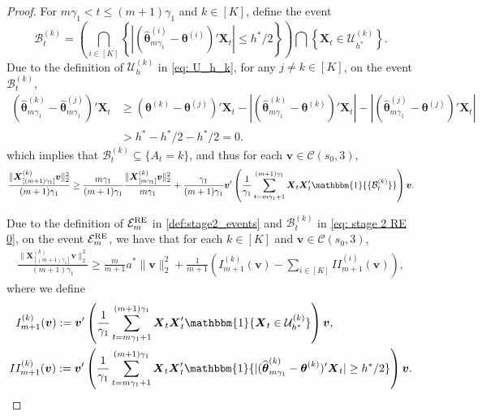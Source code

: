 \documentclass[aos,preprint]{imsart}
\theoremstyle{plain}
\theoremstyle{definition}
\newcommand{\btheta}{\boldsymbol{\theta}}
\newcommand{\hbtheta}{\widehat{\boldsymbol{\theta}}}
\newcommand{\idf}{\mathbbm{1}}
\newcommand{\bX}{\boldsymbol{X}}
\newcommand{\mC}{\mathcal{C}}
\newcommand{\bv}{\boldsymbol{v}}
\newcommand{\mE}{\mathcal{E}}
\begin{document}
\begin{appendix}
\begin{proof}
\medskip
For $m\gamma_1<t\le (m+1)\gamma_1$ and $k \in [K]$, define the event 
\begin{equation}\label{eq: stage 2 RE 0}
    \mathcal{B}_t^{(k)}= \left(\bigcap_{i\in [K]}\left\{ |(\hbtheta_{m\gamma_1}^{(i)}-\btheta^{(i)})'\bX_t|\le {h^*}/{2} \right\} \right) \bigcap \left\{\bX_t\in \mathcal{U}_{h^*}^{(k)} \right\}.
\end{equation}
Due to the definition of $\mathcal{U}_h^{(k)}$ in \eqref{eq: U_h_k}, for any $j \neq k \in [K]$,    on the event $\mathcal{B}_t^{(k)}$, 
\begin{align*}
     (\hbtheta_{m\gamma_1}^{(k)}-\hbtheta_{m\gamma_1}^{(j)})'\bX_t &\ge (\btheta^{(k)}- \btheta^{(j)})'\bX_t - |(\hbtheta_{m\gamma_1}^{(k)}-\btheta^{(k)})'\bX_t| - |(\hbtheta_{m\gamma_1}^{(j)}-\btheta^{(j)})'\bX_t|
     \\&> h^*-h^*/2-h^*/2=0.
\end{align*}
 which implies that $\mathcal{B}_t^{(k)}\subseteq \{A_t=k\}$, and thus for each $\bv\in \mC(s_0,3)$,
 \begin{align*}
     \frac{\|\bX_{[(m+1)\gamma_1]}^{(k)} \bv\|_2^2}{(m+1)\gamma_1} \geq \frac{m\gamma_1}{(m+1)\gamma_1}\frac{\|\bX_{[m\gamma_1]}^{(k)} \bv\|_2^2}{m\gamma_1} + \frac{\gamma_1}{(m+1)\gamma_1} \bv'\left(\frac{1}{\gamma_1}\sum_{t=m\gamma_1+1}^{(m+1)\gamma_1} \bX_t\bX_t'\idf{\{\mathcal{B}_t^{(k)}\}} \right) \bv.
 \end{align*}

Due to the definition of $\mE_{m}^{\textup{RE}}$ in \eqref{def:stage2_events} and $\mathcal{B}_t^{(k)}$ in \eqref{eq: stage 2 RE 0}, on the event $\mE_{m}^{\textup{RE}}$, we have that for each $k \in [K]$ and $\bv\in \mC(s_0,3)$,
\begin{equation}\label{eq: stage 2 RE 1}
\begin{aligned}
   \frac{\|\bX_{[(m+1)\gamma_1]}^{(k)} \bv\|_2^2}{(m+1)\gamma_1} \geq \frac{m}{m+1} a^*\|\bv\|_2^2 + \frac{1}{m+1} \left(I_{m+1}^{(k)}(\bv) - \sum_{i \in [K]} II_{m+1}^{(i)}(\bv) \right), 
\end{aligned}
\end{equation}
where we define 
\begin{equation*} 
\begin{aligned}
& \;\; I_{m+1}^{(k)}(\bv)  :=  \bv'\left(\frac{1}{\gamma_1}\sum_{t=m\gamma_1+1}^{(m+1)\gamma_1} \bX_t\bX_t'\idf\{\bX_t\in \mathcal{U}_{h^*}^{(k)}\} \right) \bv, \\
    &II_{m+1}^{(k)}(\bv) :=   \bv'\left(\frac{1}{\gamma_1}\sum_{t=m\gamma_1+1}^{(m+1)\gamma_1} \bX_t\bX_t'\idf\{|(\hbtheta_{m\gamma_1}^{(k)}-\btheta^{(k)})'\bX_t|\ge h^*/2\} \right) \bv.
\end{aligned}
\end{equation*}


\end{proof}
\end{appendix}
\end{document}
